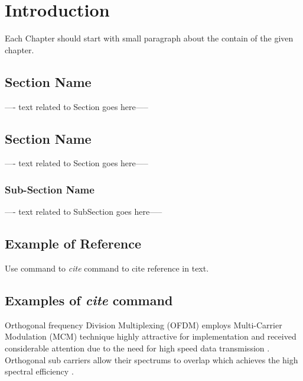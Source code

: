 %
\chapter{Introduction}

Each Chapter should start with small paragraph about the contain of the given chapter.
\section{Section Name}
---- text related to Section goes here-----
\section{Section Name}
---- text related to Section goes here-----

\subsection{Sub-Section Name}
---- text related to SubSection goes here-----



\section{Example of Reference}
Use command to \emph{cite} command to cite reference in text.
\section{Examples of \emph{cite} command}
Orthogonal frequency Division Multiplexing (OFDM) employs Multi-Carrier Modulation (MCM) technique highly attractive for implementation \cite{Lee} and received considerable attention due to the need for high speed data transmission \cite{core}. Orthogonal sub carriers allow their spectrums to overlap which achieves the high spectral efficiency \cite{loeffler,ITU263}.
